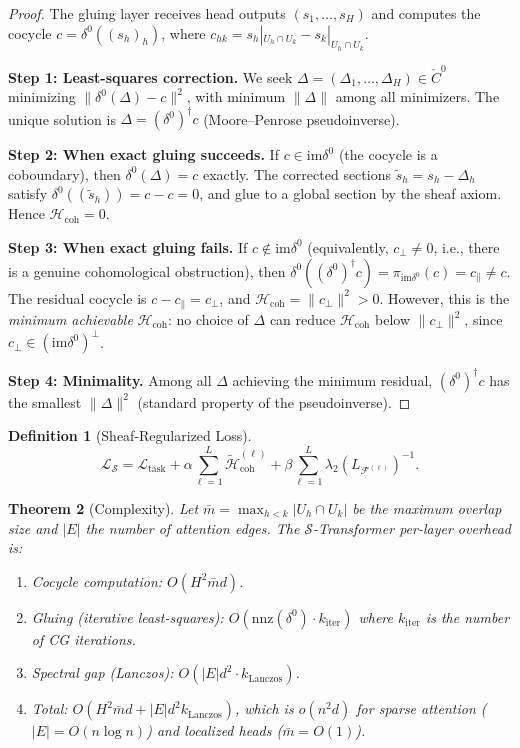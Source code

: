 \documentclass[11pt,a4paper]{article}
\theoremstyle{plain}
\newtheorem{theorem}{Theorem}[section]
\theoremstyle{definition}
\newtheorem{definition}[theorem]{Definition}
\theoremstyle{remark}
\newcommand{\cF}{\mathcal{F}}
\newcommand{\cS}{\mathcal{S}}
\newcommand{\cL}{\mathcal{L}}
\newcommand{\cH}{\mathcal{H}}
\newcommand{\im}{\mathrm{im}}
\newcommand{\Hcoh}{\mathcal{H}_{\mathrm{coh}}}
\newcommand{\Cech}{\check{C}}
\begin{document}
\begin{proof}
The gluing layer receives head outputs $(s_1, \ldots, s_H)$ and computes the cocycle $c = \delta^0((s_h)_h)$, where $c_{hk} = s_h|_{U_h\cap U_k} - s_k|_{U_h\cap U_k}$.

\textbf{Step 1: Least-squares correction.} We seek $\Delta = (\Delta_1, \ldots, \Delta_H) \in \Cech^0$ minimizing $\|\delta^0(\Delta) - c\|^2$, with minimum $\|\Delta\|$ among all minimizers. The unique solution is $\Delta = (\delta^0)^\dagger c$ (Moore--Penrose pseudoinverse).

\textbf{Step 2: When exact gluing succeeds.} If $c \in \im\delta^0$ (the cocycle is a coboundary), then $\delta^0(\Delta) = c$ exactly. The corrected sections $\tilde{s}_h = s_h - \Delta_h$ satisfy $\delta^0((\tilde{s}_h)) = c - c = 0$, and glue to a global section by the sheaf axiom. Hence $\Hcoh = 0$.

\textbf{Step 3: When exact gluing fails.} If $c \notin \im\delta^0$ (equivalently, $c_\perp \neq 0$, i.e., there is a genuine cohomological obstruction), then $\delta^0((\delta^0)^\dagger c) = \pi_{\im\delta^0}(c) = c_\parallel \neq c$. The residual cocycle is $c - c_\parallel = c_\perp$, and $\Hcoh = \|c_\perp\|^2 > 0$. However, this is the \emph{minimum achievable} $\Hcoh$: no choice of $\Delta$ can reduce $\Hcoh$ below $\|c_\perp\|^2$, since $c_\perp \in (\im\delta^0)^\perp$.

\textbf{Step 4: Minimality.} Among all $\Delta$ achieving the minimum residual, $(\delta^0)^\dagger c$ has the smallest $\|\Delta\|^2$ (standard property of the pseudoinverse).
\end{proof}

\begin{definition}[Sheaf-Regularized Loss]\label{def:loss}
\begin{equation}\label{eq:loss}
\cL_\cS = \cL_{\mathrm{task}} + \alpha\sum_{\ell=1}^L \widetilde{\cH}_{\mathrm{coh}}^{(\ell)} + \beta\sum_{\ell=1}^L \lambda_2(L_{\cF^{(\ell)}})^{-1}.
\end{equation}
\end{definition}

\begin{theorem}[Complexity]\label{thm:complexity}
Let $\bar{m} = \max_{h<k}|U_h \cap U_k|$ be the maximum overlap size and $|E|$ the number of attention edges. The $\cS$-Transformer per-layer overhead is:
\begin{enumerate}[label=(\roman*),nosep]
\item Cocycle computation: $O(H^2 \bar{m} d)$.
\item Gluing (iterative least-squares): $O(\mathrm{nnz}(\delta^0) \cdot k_{\mathrm{iter}})$ where $k_{\mathrm{iter}}$ is the number of CG iterations.
\item Spectral gap (Lanczos): $O(|E| d^2 \cdot k_{\mathrm{Lanczos}})$.
\item Total: $O(H^2 \bar{m} d + |E| d^2 k_{\mathrm{Lanczos}})$, which is $o(n^2 d)$ for sparse attention ($|E| = O(n \log n)$) and localized heads ($\bar{m} = O(1)$).
\end{enumerate}
\end{theorem}
\end{document}
